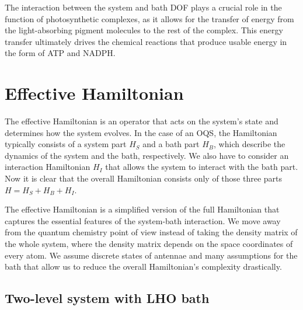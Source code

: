 The interaction between the system and bath DOF plays a crucial role in the function of photosynthetic complexes, as it allows for the transfer of energy from the light-absorbing pigment molecules to the rest of the complex. This energy transfer ultimately drives the chemical reactions that produce usable energy in the form of ATP and NADPH.

\section{Effective Hamiltonian}
\label{Effective Hamiltonian}

The effective Hamiltonian is an operator that acts on the system's state and determines how the system evolves. In the case of an OQS, the Hamiltonian typically consists of a system part $H_S$ and a bath part $H_B$, which describe the dynamics of the system and the bath, respectively. We also have to consider an interaction Hamiltonian $H_I$ that allows the system to interact with the bath part. Now it is clear that the overall Hamiltonian consists only of those three parts $H = H_S + H_B + H_I$.

The effective Hamiltonian is a simplified version of the full Hamiltonian that captures the essential features of the system-bath interaction. We move away from the quantum chemistry point of view instead of taking the density matrix of the whole system, where the density matrix depends on the space coordinates of every atom. We assume discrete states of antennae and many assumptions for the bath that allow us to reduce the overall Hamiltonian's complexity drastically.

\subsection{Two-level system with LHO bath}

